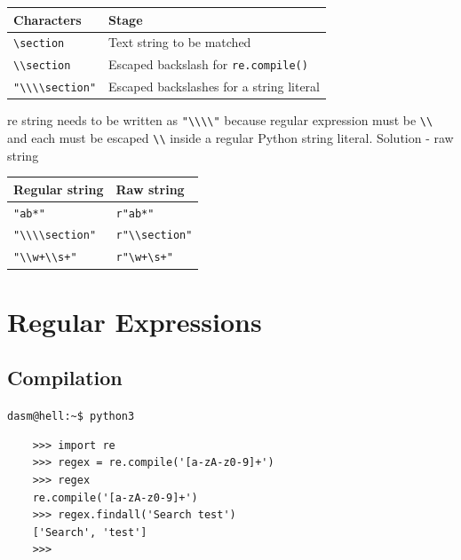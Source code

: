 \documentclass{beamer}
\begin{document}
\begin{frame}[fragile]
\begin{tabular}{ | l | p{7cm} |}
\hline
Characters & Stage \\ \hline
\verb/\section/ & Text string to be matched \\
\verb/\\section/ & Escaped backslash for \verb/re.compile()/ \\
\verb/"\\\\section"/ & Escaped backslashes for a string literal \\
\hline
\end{tabular}
\pause
re string needs to be written as \verb/"\\\\"/ because regular expression must be \verb/\\/ and each must be escaped \verb/\\/ inside a regular Python string literal.
\pause
Solution - raw string
\begin{tabular}{ | l | p{7cm} |}
\hline
Regular string & Raw string \\ \hline
\verb/"ab*"/ & \verb/r"ab*"/ \\
\verb/"\\\\section"/ & \verb/r"\\section"/ \\
\verb/"\\w+\\s+"/ & \verb/r"\w+\s+"/ \\
\hline
\end{tabular}
\end{frame}

\section{Regular Expressions}
\subsection{Compilation}
\begin{frame}[fragile]
    \verb|dasm@hell:~$ python3|
    \begin{lstlisting}
    >>> import re
    >>> regex = re.compile('[a-zA-z0-9]+')
    >>> regex
    re.compile('[a-zA-z0-9]+')
    >>> regex.findall('Search test')
    ['Search', 'test']
    >>>
    \end{lstlisting}
\end{frame}
\end{document}
